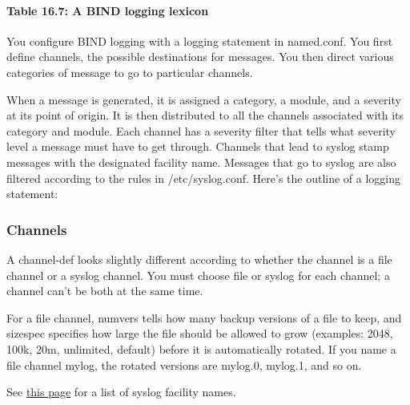 \paragraph[{Table 16.7: }A BIND logging lexicon]{\texorpdfstring{{Table
16.7:
}\protect\hypertarget{part0024_split_070.htmlux5cux23_idTextAnchor956}{}{}A
BIND logging lexicon}{Table 16.7: A BIND logging lexicon}}


You configure BIND logging with a {logging }statement in {named.conf}.
You first define channels, the possible destinations for messages. You
then direct various categories of message to go to particular channels.

When a message is generated, it is assigned a category, a module, and a
severity at its point of origin. It is then distributed to all the
channels associated with its category and module. Each channel has a
severity filter that tells what severity level a message must have to
get through. Channels that lead to syslog stamp messages with the
designated facility name. Messages that go to syslog are also filtered
according to the rules in {/etc/syslog.conf}. Here's the outline of a
{logging}
statement:\protect\hypertarget{part0024_split_070.htmlux5cux23_idIndexMarker2285}{}{}


\subsubsection[Channels]{\texorpdfstring{\protect\hypertarget{part0024_split_070.htmlux5cux23_idTextAnchor957}{}{}Channels}{Channels}}

A {channel-def} looks slightly different according to whether the
channel is a file channel or a syslog channel. You must choose {file} or
{syslog} for each channel; a channel can't be both at the same
time.\protect\hypertarget{part0024_split_070.htmlux5cux23_idIndexMarker2286}{}{}


For a file channel, {numvers} tells how many backup versions of a file
to keep, and {sizespec} specifies how large the file should be allowed
to grow (examples: {2048}, {100k}, {20m}, {unlimited}, {default}) before
it is automatically rotated. If you name a file channel {mylog}, the
rotated versions are {mylog.0}, {mylog.1}, and so on.

\leavevmode\hypertarget{part0024_split_070.htmlux5cux23_idContainer1057}{}%
See
\protect\hyperlink{part0017_split_012.htmlux5cux23_idTextAnchor513}{this
page} for a list of syslog facility names.

